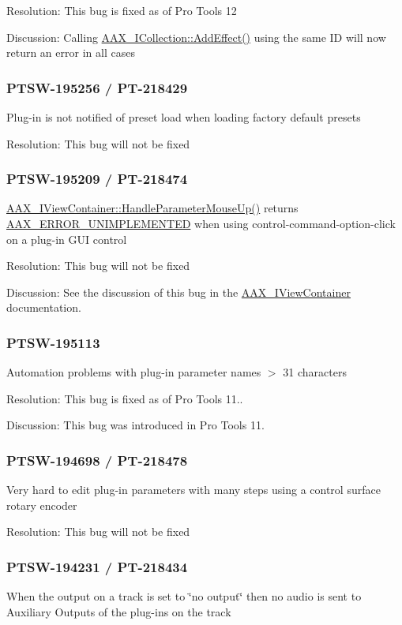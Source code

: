 Resolution\+: This bug is fixed as of Pro Tools 12

Discussion\+: Calling \hyperlink{a00087_a5ff114b8c4da2081515186f2faf65c8c}{A\+A\+X\+\_\+\+I\+Collection\+::\+Add\+Effect()} using the same I\+D will now return an error in all cases\hypertarget{a00374_PTSW-195256}{}\subsubsection{P\+T\+S\+W-\/195256 / P\+T-\/218429}\label{a00374_PTSW-195256}
Plug-\/in is not notified of preset load when loading factory default presets

Resolution\+: This bug will not be fixed\hypertarget{a00374_PTSW-195209}{}\subsubsection{P\+T\+S\+W-\/195209 / P\+T-\/218474}\label{a00374_PTSW-195209}
\hyperlink{a00117_a28458b791dc2fede05e64c1e5f596855}{A\+A\+X\+\_\+\+I\+View\+Container\+::\+Handle\+Parameter\+Mouse\+Up()} returns \hyperlink{a00207_a5f8c7439f3a706c4f8315a9609811937a3b76994b32b97fcd56b19ef8032245df}{A\+A\+X\+\_\+\+E\+R\+R\+O\+R\+\_\+\+U\+N\+I\+M\+P\+L\+E\+M\+E\+N\+T\+E\+D} when using control-\/command-\/option-\/click on a plug-\/in G\+U\+I control

Resolution\+: This bug will not be fixed

Discussion\+: See the discussion of this bug in the \hyperlink{a00117}{A\+A\+X\+\_\+\+I\+View\+Container} documentation.\hypertarget{a00374_PTSW-195113}{}\subsubsection{P\+T\+S\+W-\/195113}\label{a00374_PTSW-195113}
Automation problems with plug-\/in parameter names $>$ 31 characters

Resolution\+: This bug is fixed as of Pro Tools 11..

Discussion\+: This bug was introduced in Pro Tools 11.\hypertarget{a00374_PTSW-194698}{}\subsubsection{P\+T\+S\+W-\/194698 / P\+T-\/218478}\label{a00374_PTSW-194698}
Very hard to edit plug-\/in parameters with many steps using a control surface rotary encoder

Resolution\+: This bug will not be fixed\hypertarget{a00374_PTSW-194231}{}\subsubsection{P\+T\+S\+W-\/194231 / P\+T-\/218434}\label{a00374_PTSW-194231}
When the output on a track is set to \char`\"{}no output\char`\"{} then no audio is sent to Auxiliary Outputs of the plug-\/ins on the track

